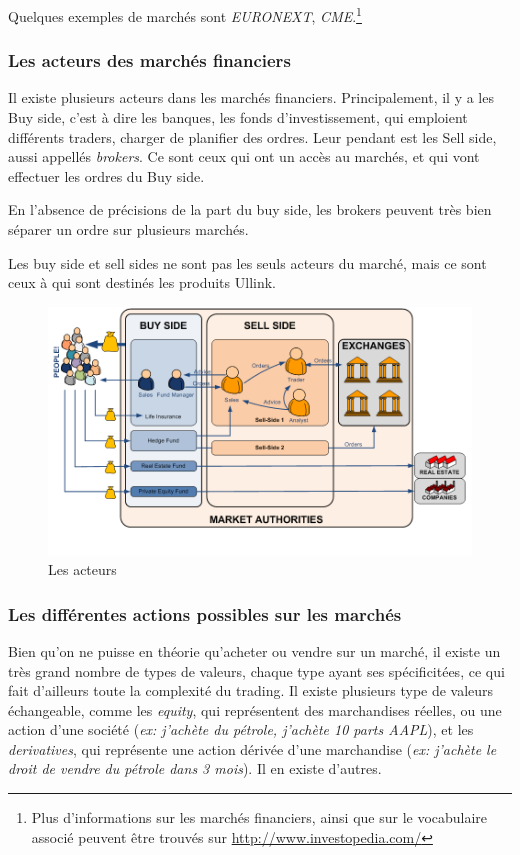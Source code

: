 \documentclass[a4paper, 12pt]{article}
\begin{document}
Quelques exemples de marchés sont \emph{EURONEXT}, \emph{CME}.\footnote{Plus d'informations sur les marchés financiers, ainsi que sur le vocabulaire associé peuvent être trouvés sur \url{http://www.investopedia.com/}}

\subsubsection{Les acteurs des marchés financiers}

Il existe plusieurs acteurs dans les marchés financiers. Principalement, il y a les Buy side, c'est à dire les banques, les fonds d'investissement, qui emploient différents traders, charger de planifier des ordres. Leur pendant est les Sell side, aussi appellés \emph{brokers}. Ce sont ceux qui ont un accès au marchés, et qui vont effectuer les ordres du Buy side.

En l'absence de précisions de la part du buy side, les brokers peuvent très bien séparer un ordre sur plusieurs marchés.

Les buy side et sell sides ne sont pas les seuls acteurs du marché, mais ce sont ceux à qui sont destinés les produits Ullink.

\begin{figure}
\includegraphics[width=\textwidth]{market_actors.png}
\caption{Les acteurs}
\label{market_actors}
\end{figure}

\subsubsection{Les différentes actions possibles sur les marchés}

Bien qu'on ne puisse en théorie qu'acheter ou vendre sur un marché, il existe un très grand nombre de types de valeurs, chaque type ayant ses spécificitées, ce qui fait d'ailleurs toute la complexité du trading. Il existe plusieurs type de valeurs échangeable, comme les \emph{equity}, qui représentent des marchandises réelles, ou une action d'une société (\emph{ex: j'achète du pétrole, j'achète 10 parts AAPL}), et les \emph{derivatives}, qui représente une action dérivée d'une marchandise (\emph{ex: j'achète le droit de vendre du pétrole dans 3 mois}). Il en existe d'autres.
\end{document}
